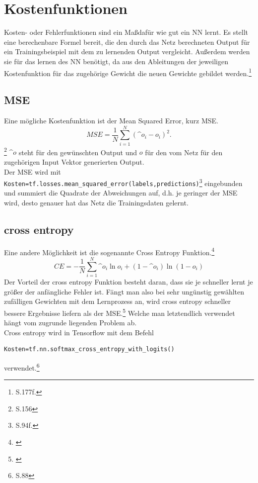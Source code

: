 \section{Kostenfunktionen}
Kosten- oder Fehlerfunktionen sind ein Ma\ss daf\"ur wie gut ein \gls{NN} lernt. Es stellt eine berechenbare Formel bereit, die den durch das Netz berechneten Output f\"ur ein Trainingsbeispiel mit dem zu lernenden Output vergleicht. Au\ss erdem werden sie f\"ur das lernen des \gls{NN} ben\"otigt, da aus den Ableitungen der jeweiligen Kostenfunktion f\"ur das zugeh\"orige Gewicht die neuen Gewichte gebildet werden.\footnote{\cite{Goodfellow}S.177f.}
\subsection{MSE}
Eine m\"ogliche Kostenfunktion ist der Mean Squared Error, kurz MSE.
\begin{equation}
MSE=\frac{1}{N}\sum_{i=1}^{N} (\^{o}_i-o_i)^2.
\end{equation}\footnote{\cite{Rojas1996}S.156}
$\^{o}$ steht f\"ur den gew\"unschten Output und $o$ f\"ur den vom Netz f\"ur den zugeh\"origen Input Vektor generierten Output.\\
Der MSE wird mit  \lstinline$Kosten=tf.losses.mean_squared_error(labels,predictions)$\footnote{\cite{cookbook}S.94f.} eingebunden und summiert die Quadrate der Abweichungen auf, d.h. je geringer der MSE wird, desto genauer hat das Netz die Trainingsdaten gelernt.
\subsection{cross entropy}
Eine andere M\"oglichkeit ist die sogenannte Cross Entropy Funktion.\footnote{\cite{Nielsen}}
\begin{equation}
CE= - \frac{1}{N} \sum_{i=1}^{N}\^{o}_i \ln o_i + (1- \^{o}_i) \ln (1-o_i)
\end{equation}
Der Vorteil der cross entropy Funktion besteht daran, dass sie je schneller lernt je gr\"o\ss er der anf\"angliche Fehler ist. F\"angt man also bei sehr ung\"unstig gew\"ahlten zuf\"alligen Gewichten mit dem Lernprozess an, wird cross entropy schneller bessere Ergebnisse liefern als der MSE.\footnote{\cite{Nielsen}} Welche man letztendlich verwendet h\"angt vom zugrunde liegenden Problem ab.\\
Cross entropy wird in Tensorflow mit dem Befehl 
\begin{lstlisting}
Kosten=tf.nn.softmax_cross_entropy_with_logits()
\end{lstlisting}verwendet.\footnote{\cite{cookbook}S.88}
